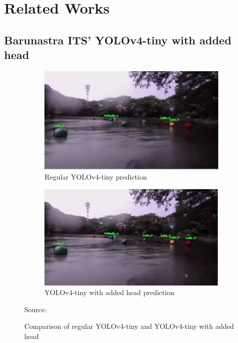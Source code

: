 \section{Related Works}
\label{section:relatedwork}

  \subsection{Barunastra ITS' YOLOv4-tiny with added head}%

  \begin{figure}[p]
    \hfill%
    \begin{subfigure}[c][][c]{.45\textwidth}
        \includegraphics[width=1\linewidth]{figures/yolov4barun-regular.png}
        \caption{Regular YOLOv4-tiny prediction}
        \label{fig:barun-yolov4}
    \end{subfigure}\hfill  
    \begin{subfigure}[c][][c]{.45\textwidth}
        \includegraphics[width=1\linewidth]{figures/yolov4barun-addhead.png}
        \caption{YOLOv4-tiny with added head prediction}
        \label{fig:barun-yolov4-3l}
    \end{subfigure}\hfill%
    \caption*{Source: \textcite{barunastra}}
    \vspace{-1ex}
    \caption{Comparison of regular YOLOv4-tiny and YOLOv4-tiny with added head}
    \label{fig:barun}
  \end{figure}


